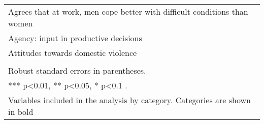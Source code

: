 \begin{longtable}{m{13cm}}
Agrees that at work, men cope better with difficult conditions than women\\
Agency: input in productive decisions\\
Attitudes towards domestic violence \\
\midrule
\begin{minipage}{13cm}
\small{
{\textit Notes:} \\
Robust standard errors in parentheses. \\
*** p\textless{}0.01, ** p\textless{}0.05, * p\textless{}0.1 . \\
Variables included in the analysis by category. Categories are shown in bold
}
\end{minipage} \\* \bottomrule
\end{longtable}
